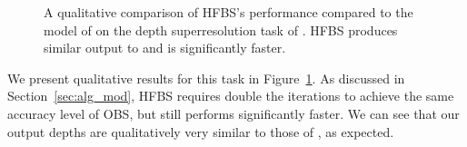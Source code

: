 \begin{figure}
  \centering
  \hfill
  \hfill
  \vspace{10pt}
  \caption{A qualitative comparison of HFBS's performance
  compared to the model of \cite{BarronPoole2016} on the depth superresolution
  task of \cite{ferstl2013b}. HFBS produces similar output to \cite{BarronPoole2016} and is significantly faster.}
  \label{fig:depth_superres}
\end{figure}


We present qualitative results for this task in Figure~\ref{fig:depth_superres}.
As discussed in Section~\ref{sec:alg_mod}, HFBS requires double the iterations to achieve the same accuracy level of OBS, but still performs significantly faster.
We can see that our output depths are qualitatively very similar to those of
\cite{BarronPoole2016}, as expected.
